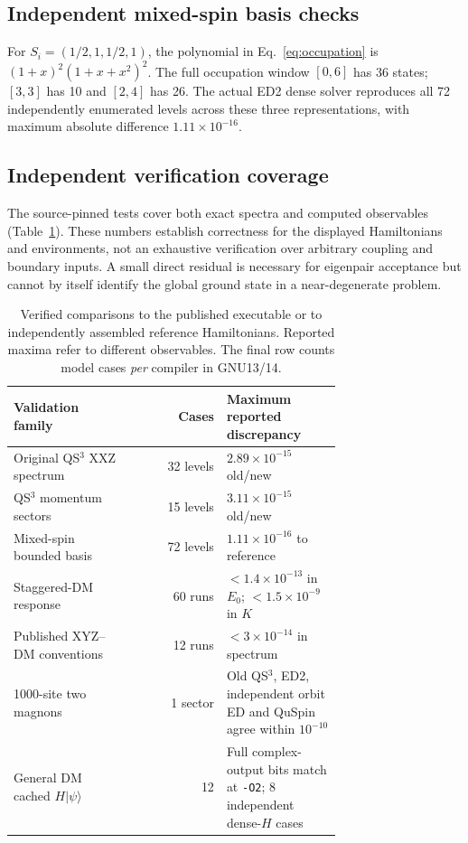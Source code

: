 \documentclass[preprint,12pt,nopreprintline]{elsarticle}
\begin{document}
\subsection{Independent mixed-spin basis checks}
For $S_i=(1/2,1,1/2,1)$, the polynomial in
Eq.~\eqref{eq:occupation} is
$(1+x)^2(1+x+x^2)^2$.
The full occupation window $[0,6]$ has 36 states;
$[3,3]$ has 10 and $[2,4]$ has 26.
The actual ED2 dense solver reproduces all
72 independently enumerated levels across these three
representations, with maximum absolute difference
$1.11\times10^{-16}$.


\subsection{Independent verification coverage}
The source-pinned tests cover both exact spectra and
computed observables (Table~\ref{tab:validation}).
These numbers establish correctness for the displayed
Hamiltonians and environments, not an exhaustive
verification over arbitrary coupling and boundary inputs.
A small direct residual is necessary for eigenpair
acceptance but cannot by itself identify the global
ground state in a near-degenerate problem.

\begin{table}[t]
\centering
\caption{Verified comparisons to the published executable
or to independently assembled reference Hamiltonians.
Reported maxima refer to different observables. The final
row counts model cases \emph{per} compiler in GNU13/14.}
\label{tab:validation}
\small
\begin{tabular}{p{0.37\linewidth}r p{0.35\linewidth}}
\toprule
Validation family & Cases & Maximum reported discrepancy \\
\midrule
Original QS$^3$ XXZ spectrum & 32 levels & $2.89\times10^{-15}$ old/new \\
QS$^3$ momentum sectors & 15 levels & $3.11\times10^{-15}$ old/new \\
Mixed-spin bounded basis & 72 levels & $1.11\times10^{-16}$ to reference \\
Staggered-DM response & 60 runs & $<1.4\times10^{-13}$ in $E_0$;
$<1.5\times10^{-9}$ in $K$ \\
Published XYZ--DM conventions & 12 runs & $<3\times10^{-14}$ in spectrum \\
1000-site two magnons & 1 sector & Old QS$^3$, ED2, independent orbit ED and QuSpin agree within $10^{-10}$ \\
General DM cached $H|\psi\rangle$ & 12 & Full complex-output bits match at \texttt{-O2}; 8 independent dense-$H$ cases \\
\bottomrule
\end{tabular}
\end{table}
\end{document}
